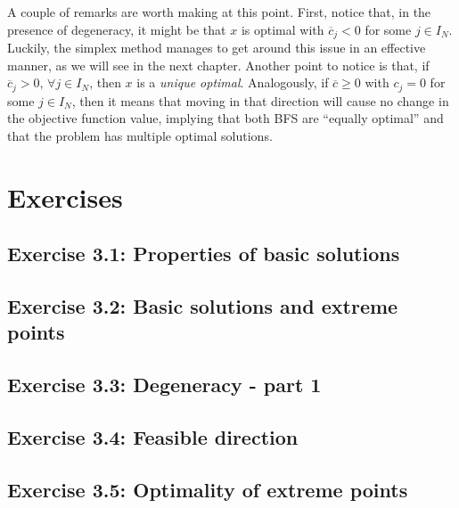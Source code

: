 A couple of remarks are worth making at this point. First, notice that, in the presence of degeneracy, it might be that $x$ is optimal with $\overline{c}_j < 0$ for some $j \in I_N$. Luckily, the simplex method manages to get around this issue in an effective manner, as we will see in the next chapter. Another point to notice is that, if $\overline{c}_j > 0$, $\forall j \in I_N$, then $x$ is a \emph{unique optimal}. Analogously, if $\overline{c} \geq 0$ with $c_j =0$ for some $j \in I_N$, then it means that moving in that direction will cause no change in the objective function value, implying that both BFS are ``equally optimal'' and that the problem has multiple optimal solutions. 


\section{Exercises}

\subsection*{Exercise 3.1: Properties of basic solutions}


\subsection*{Exercise 3.2: Basic solutions and extreme points}


\subsection*{Exercise 3.3: Degeneracy - part 1}


\subsection*{Exercise 3.4: Feasible direction}


\subsection*{Exercise 3.5: Optimality of extreme points}






